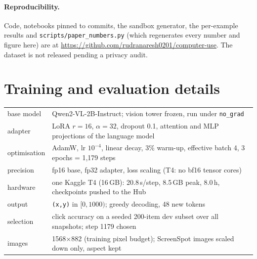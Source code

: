 \documentclass[11pt]{article}
\begin{document}
\paragraph{Reproducibility.} Code, notebooks pinned to commits, the sandbox generator, the per-example
results and \texttt{scripts/paper\_numbers.py} (which regenerates every number and figure here) are at
\url{https://github.com/rudranaresh0201/computer-use}. The dataset is not released pending a privacy audit.




\appendix

\section{Training and evaluation details}
\begin{table}[H]
\centering\small
\begin{tabular}{ll}
\toprule
base model & Qwen2-VL-2B-Instruct; vision tower frozen, run under \texttt{no\_grad} \\
adapter & LoRA $r{=}16$, $\alpha{=}32$, dropout 0.1, attention and MLP projections of the language model \\
optimisation & AdamW, lr $10^{-4}$, linear decay, 3\% warm-up, effective batch 4, 3 epochs = 1,179 steps \\
precision & fp16 base, fp32 adapter, loss scaling (T4: no bf16 tensor cores) \\
hardware & one Kaggle T4 (16\,GB): 20.8\,s/step, 8.5\,GB peak, 8.0\,h, checkpoints pushed to the Hub \\
output & \texttt{(x,y)} in $[0,1000)$; greedy decoding, 48 new tokens \\
selection & click accuracy on a seeded 200-item dev subset over all snapshots; step 1179 chosen \\
images & 1568$\times$882 (training pixel budget); ScreenSpot images scaled down only, aspect kept \\
\bottomrule
\end{tabular}
\end{table}
\end{document}
